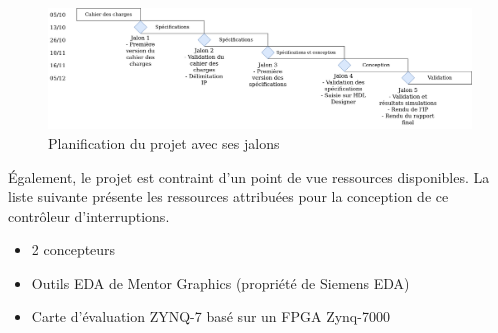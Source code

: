 \begin{figure}[H]
	\centering
	\includegraphics[width=0.85\linewidth]{figure/planning.png}
	\caption{Planification du projet avec ses jalons}
	\label{fig:planning}
\end{figure}

Également, le projet est contraint d'un point de vue ressources disponibles.
La liste suivante présente les ressources attribuées pour la conception de ce contrôleur d'interruptions.

\begin{itemize}
	\item 2 concepteurs
	\item Outils EDA de Mentor Graphics (propriété de Siemens EDA)
	\item Carte d'évaluation ZYNQ-7 basé sur un FPGA Zynq-7000
\end{itemize}
